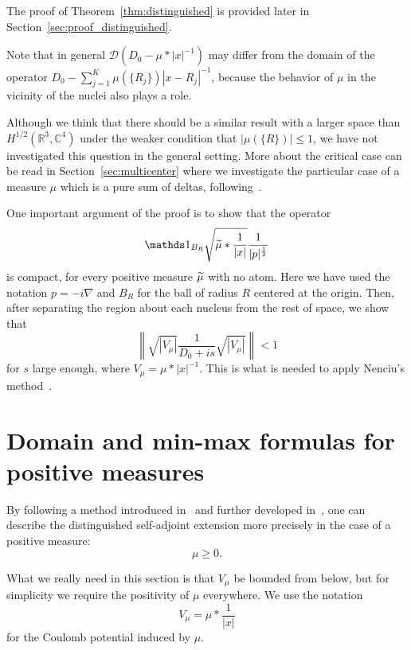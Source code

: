 \documentclass[AHL,Unicode,published]{cedram}
\newcommand{\R}{\mathbb{R}}
\newcommand{\C}{\mathbb{C}}
\newcommand{\cD}{\mathcal{D}}
\newcommand\1{{\ensuremath {\mathds 1} }}
\newcommand{\norm}[1]{ \left\| #1 \right\|}
\renewcommand{\geq}{\geqslant}
\renewcommand{\leq}{\leqslant}
\renewcommand{\tilde}{\widetilde}
\let\oldtilde\tilde
\renewcommand*{\tilde}[1]{\mathchoice{\widetilde{#1}}{\widetilde{#1}}{\oldtilde{#1}}{\oldtilde{#1}}}
\begin{document}
The proof of Theorem~\ref{thm:distinguished} is provided later in Section~\ref{sec:proof_distinguished}.
\vspace{3pt}

Note that in general $\cD(D_0-\mu\ast|x|^{-1})$ may differ from the domain of the operator $D_0-\sum_{j=1}^K\mu(\{R_j\})|x-R_j|^{-1}$, because the behavior of $\mu$ in the vicinity of the nuclei also plays a role.

Although we think that there should be a similar result with a larger space than $H^{1/2}(\R^3,\C^4)$ under the weaker condition that $|\mu(\{R\})|\leq 1$, we have not investigated this question in the general setting. More about the critical case can be read in Section~\ref{sec:multicenter} where we investigate the particular case of a measure $\mu$ which is a pure sum of deltas, following~\cite{EstLewSer-19}.

\vspace{3pt}

One important argument of the proof is to show that the operator
\[
\1_{B_R}\sqrt{\tilde\mu\ast\frac1{|x|}}\frac{1}{|p|^{\frac12}}
\]
is compact, for every positive measure $\tilde\mu$ with no atom. Here we have used the notation $p=-i\nabla$ and $B_R$ for the ball of radius $R$ centered at the origin. Then, after separating the region about each nucleus from the rest of space, we show that
\[
\norm{\sqrt{\left|V_\mu\right|}\frac1{D_0+is}\sqrt{\left|V_\mu\right|}}<1
\]
for $s$ large enough, where $V_\mu=\mu\ast|x|^{-1}$. This is what is needed to apply Nenciu's method~\cite[Corollary~2.1]{Nenciu-76}.



\section{Domain and min-max formulas for positive measures}\label{sec:min-max}



By following a method introduced in~\cite{EstLos-07,EstLos-08} and further developed in~\cite{EstLewSer-19,SchSolTok-20}, one can describe the distinguished self-adjoint extension more precisely in the case of a positive measure:
\[
\mu\geq0.
\]

What we really need in this section is that $V_\mu$ be bounded from below, but for simplicity we require the positivity of $\mu$ everywhere. We use the notation
\[
\boxed{V_\mu=\mu\ast\frac1{|x|}}
\]
for the Coulomb potential induced by $\mu$.
\end{document}
